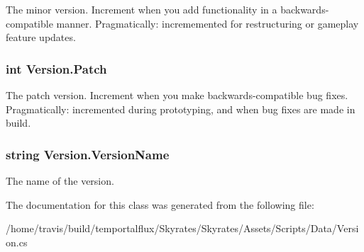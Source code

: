 The minor version. Increment when you add functionality in a backwards-\/compatible manner. Pragmatically\-: incrememented for restructuring or gameplay feature updates. 

\hypertarget{class_version_a4ec3e76901e7c0d080b3113d24e3a5aa}{
\subsubsection[{Patch}]{\setlength{\rightskip}{0pt plus 5cm}int Version.\-Patch}}\label{class_version_a4ec3e76901e7c0d080b3113d24e3a5aa}


The patch version. Increment when you make backwards-\/compatible bug fixes. Pragmatically\-: incremented during prototyping, and when bug fixes are made in build. 

\hypertarget{class_version_a55ae9ac9a38915b9bc0cfab9953e9c21}{
\subsubsection[{Version\-Name}]{\setlength{\rightskip}{0pt plus 5cm}string Version.\-Version\-Name}}\label{class_version_a55ae9ac9a38915b9bc0cfab9953e9c21}


The name of the version. 



The documentation for this class was generated from the following file\-:\begin{DoxyCompactItemize}
\item 
/home/travis/build/temportalflux/\-Skyrates/\-Skyrates/\-Assets/\-Scripts/\-Data/Version.\-cs\end{DoxyCompactItemize}
